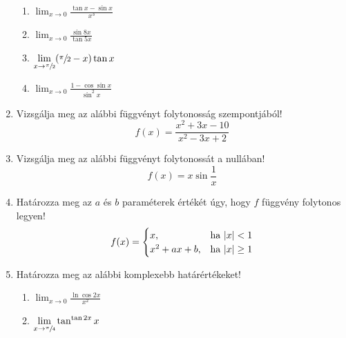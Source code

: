 \documentclass[a4paper, 12pt]{scrartcl}
\begin{document}
\begin{enumerate}
\begin{multicols}{2}
\begin{enumerate}
            \item $\displaystyle
                    \lim_{x \rightarrow 0} \frac{\tan x - \sin x}{x^3}
                  $

            \item $\displaystyle
                    \lim_{x \rightarrow 0} \frac{\sin 8x}{\tan 5x}
                  $

            \item $\displaystyle
                    \lim_{x \rightarrow \sfrac{\pi}{2}} (\sfrac{\pi}{2} - x) \tan x
                  $

            \item $\displaystyle
                    \lim_{x \rightarrow 0} \frac{1 - \cos \sin x}{\sin^2 x}
                  $
          \end{enumerate}
        \end{multicols}

  \item Vizsgálja meg az alábbi függvényt folytonosság szempontjából!
        \[
          f(x) = \frac{x^2 + 3x - 10}{x^2 - 3x + 2}
        \]

  \item Vizsgálja meg az alábbi függvényt folytonossát a nullában!
        \[
          f(x) = x \sin \frac1x
        \]

  \item Határozza meg az $a$ és $b$ paraméterek értékét úgy, hogy $f$ függvény
        folytonos legyen!
        \[
          f(x) = \begin{cases}
            x \text,            & \text{ha } |x| < 1    \\
            x^2 + ax + b \text, & \text{ha } |x| \geq 1
          \end{cases}
        \]

  \item Határozza meg az alábbi komplexebb határértékeket!
        \begin{multicols}{2}
          \begin{enumerate}
            \item $\displaystyle
                    \lim_{x \rightarrow 0} \frac{\ln \cos 2x}{x^2}
                  $

            \item $\displaystyle
                    \lim_{x \rightarrow \sfrac{\pi}{4}} \tan^{\tan 2x} x
                  $
          \end{enumerate}
        \end{multicols}
\end{enumerate}

\end{document}
